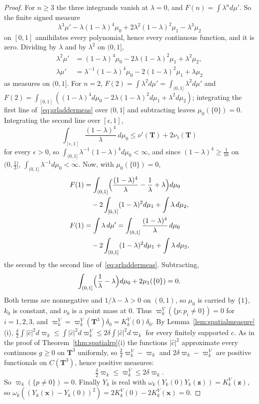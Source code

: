 \documentclass[aps,prd,twocolumn,superscriptaddress,nofootinbib,longbibliography,floatfix,amsmath,amssymb,10pt]{revtex4-2}
\theoremstyle{definition}
\theoremstyle{remark}
\begin{document}
\begin{proof}
For $n\ge3$ the three integrands vanish at $\lambda=0$, and $F(n)=\int
\lambda^nd\mu'$. So the finite signed measure
\[
\lambda^3\mu'-\lambda(1-\lambda)^4\mu_0+2\lambda^2(1-\lambda)^2\mu_1-
\lambda^3\mu_2
\]
on $[0,1]$ annihilates every polynomial, hence every continuous function,
and it is zero. Dividing by $\lambda$ and by $\lambda^2$ on $(0,1]$,
\begin{equation}\label{eq:srladdermeas}
\begin{split}
\lambda^2\mu'&=(1-\lambda)^4\mu_0-2\lambda(1-\lambda)^2\mu_1+\lambda^2
\mu_2,\\
\lambda\mu'&=\lambda^{-1}(1-\lambda)^4\mu_0-2(1-\lambda)^2\mu_1+\lambda
\mu_2
\end{split}
\end{equation}
as measures on $(0,1]$. For $n=2$, $F(2)=\int\lambda^2d\mu'=\int_{(0,1]}
\lambda^2d\mu'$ and $F(2)=\int_{[0,1]}((1-\lambda)^4d\mu_0-2\lambda
(1-\lambda)^2d\mu_1+\lambda^2d\mu_2)$; integrating the first line
of~\eqref{eq:srladdermeas} over $(0,1]$ and subtracting leaves
$\mu_0(\{0\})=0$. Integrating the second line over $[\epsilon,1]$,
\[
\int_{[\epsilon,1]}\frac{(1-\lambda)^4}\lambda\,d\mu_0\le\nu'(\mathbf T)+
2\nu_1(\mathbf T)
\]
for every $\epsilon>0$, so $\int_{(0,1]}\lambda^{-1}(1-\lambda)^4d\mu_0
<\infty$, and since $(1-\lambda)^4\ge\frac1{16}$ on $(0,\frac12]$,
$\int_{(0,1]}\lambda^{-1}d\mu_0<\infty$. Now, with $\mu_0(\{0\})=0$,
\[
\begin{split}
F(1)&=\int_{(0,1]}\Bigl(\frac{(1-\lambda)^4}\lambda-\frac1\lambda+\lambda
\Bigr)d\mu_0\\
&\quad-2\int_{[0,1]}(1-\lambda)^2d\mu_1+\int\lambda\,d\mu_2,\\
F(1)&=\int\lambda\,d\mu'=\int_{(0,1]}\frac{(1-\lambda)^4}\lambda\,d\mu_0\\
&\quad-2\int_{(0,1]}(1-\lambda)^2d\mu_1+\int\lambda\,d\mu_2 ,
\end{split}
\]
the second by the second line of~\eqref{eq:srladdermeas}. Subtracting,
\[
\int_{(0,1]}\Bigl(\frac1\lambda-\lambda\Bigr)d\mu_0+2\mu_1(\{0\})=0 .
\]
Both terms are nonnegative and $1/\lambda-\lambda>0$ on $(0,1)$, so $\mu_0$
is carried by $\{1\}$, $k_0$ is constant, and $\nu_0$ is a point mass at
$0$. Thus $\varpi^V_k(\{p:p_i\ne0\})=0$ for $i=1,2,3$, and $\varpi^V_k=
\varpi^V_k(\mathbf T^3)\delta_0=K^V_k(0)\delta_0$. By
Lemma~\ref{lem:spatialmeasure}(i), $\frac\delta2\int|\hat c|^2d\varpi_k\le
\int|\hat c|^2d\varpi^V_k\le2\delta\int|\hat c|^2d\varpi_k$ for every
finitely supported $c$. As in the proof of Theorem~\ref{thm:spatialrp}(i)
the functions $|\hat c|^2$ approximate every continuous $g\ge0$ on
$\mathbf T^3$ uniformly, so $\frac2\delta\varpi^V_k-\varpi_k$ and
$2\delta\varpi_k-\varpi^V_k$ are positive functionals on $C(\mathbf T^3)$,
hence positive measures:
\begin{equation}\label{eq:varpicompare}
\tfrac\delta2\varpi_k\le\varpi^V_k\le2\delta\varpi_k .
\end{equation}
So $\varpi_k(\{p\ne0\})=0$. Finally $Y_k$
is real with $\omega_k(Y_k(0)Y_k(\mathbf z))=K^V_k(\mathbf z)$, so
$\omega_k((Y_k(\mathbf x)-Y_k(0))^2)=2K^V_k(0)-2K^V_k(\mathbf x)=0$.


\end{proof}
\end{document}
